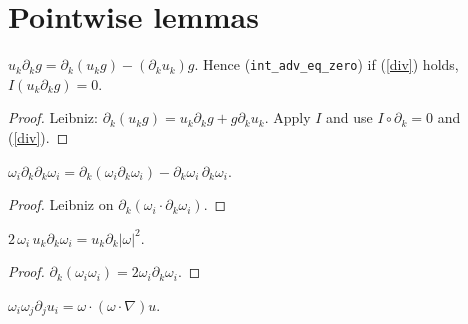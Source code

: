 \documentclass[11pt]{article}
\begin{document}
\section{Pointwise lemmas}
\begin{lemma}
$u_k\partial_k g=\partial_k(u_k g)-(\partial_k u_k)g$. Hence (\texttt{int\_adv\_eq\_zero}) if
(\ref{div}) holds, $I(u_k\partial_k g)=0$.
\end{lemma}
\begin{proof}Leibniz: $\partial_k(u_kg)=u_k\partial_kg+g\partial_ku_k$. Apply $I$ and use
$I\circ\partial_k=0$ and (\ref{div}).\end{proof}
\begin{lemma}
$\omega_i\partial_k\partial_k\omega_i=\partial_k(\omega_i\partial_k\omega_i)-\partial_k\omega_i\,\partial_k\omega_i$.
\end{lemma}
\begin{proof}Leibniz on $\partial_k(\omega_i\cdot\partial_k\omega_i)$.\end{proof}
\begin{lemma}
$2\,\omega_i\,u_k\partial_k\omega_i=u_k\partial_k|\omega|^2$.
\end{lemma}
\begin{proof}$\partial_k(\omega_i\omega_i)=2\omega_i\partial_k\omega_i$.\end{proof}
\begin{lemma}
$\omega_i\omega_j\partial_ju_i=\omega\cdot(\omega\cdot\nabla)u$.
\end{lemma}
\end{document}
